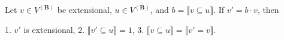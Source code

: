 Let $v \in V^{(\mathbf{B})}$ be extensional, $u \in V^{(\mathbf{B})}$, and $b = \llbracket v \subseteq u \rrbracket$. If $v' = b \cdot v$, then

1. $v'$ is extensional,
2. $\llbracket v' \subseteq u \rrbracket = 1$,
3. $\llbracket v \subseteq u \rrbracket = \llbracket v' = v \rrbracket$.
